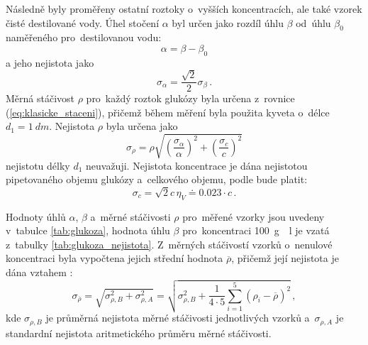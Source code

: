 \documentclass{../concepts/titul_protokol_p/prepareprotokol} %
\newcommand{\relative}[1]{
\frac{\sigma_{#1}}{#1}
}
\newcommand{\squared}[1]{
\left( #1 \right)^2
}
\newcommand{\relsqr}[1]{
\squared{\relative{#1}}
}
\begin{document}
Následně byly proměřeny ostatní roztoky o~vyšších koncentracích, ale také vzorek čisté destilované vody. 
Úhel stočení $\alpha$ byl určen jako rozdíl úhlu $\beta$ od~úhlu $\beta_0$ naměřeného pro~destilovanou vodu:
\begin{equation}
    \label{eq:alfa_glukoza}
    \alpha = \beta - \beta_0
\end{equation}
a jeho nejistota jako \cite{englich}
\begin{equation}
    \label{eq:sigma_alfa_glukoza}
    \sigma_{\alpha} = \frac{\sqrt{2}}{2} \sigma_{\beta} \,.
\end{equation}
Měrná stáčivost $\rho$ pro~každý roztok glukózy byla určena z~rovnice (\ref{eq:klasicke_staceni}), přičemž během 
měření byla použita kyveta 
o~délce $d_1 = \qty{1}{dm}$. Nejistota $\rho$ byla určena jako \cite{englich}
\begin{equation}
    \label{eq:sigma_rho}
    \sigma_{\rho} = \rho \sqrt{ \relsqr{\alpha} + \relsqr{c}}
\end{equation}
nejistotu délky $d_1$ neuvažuji. Nejistota koncentrace je dána nejistotou pipetovaného objemu glukózy a~celkového
objemu, podle \cite{englich} bude platit:
\begin{equation}
    \label{eq:sigma_c}
    \sigma_c = \sqrt{2} c \,\eta_V \doteq 0.023 \cdot c \,.
\end{equation}

Hodnoty úhlů $\alpha$, $\beta$ a~měrné stáčivosti $\rho$ pro~měřené vzorky
jsou uvedeny v~tabulce \ref{tab:glukoza}, hodnota úhlu $\beta$ pro~koncentraci \qty{100}{g \per l} je vzatá
z~tabulky \ref{tab:glukoza_nejistota}. Z~měrných stáčivostí vzorků o~nenulové koncentraci byla vypočtena
jejich střední hodnota $\overline{\rho}$, přičemž její nejistota je dána vztahem \cite{englich}:
\begin{equation}
    \label{eq:sigma_mean_rho}
    \sigma_{\overline{\rho}} = \sqrt{ \sigma_{\rho, B}^2 + \sigma_{\rho,A}^2 } = \sqrt{ \sigma_{\rho, B}^2 + 
        \frac{1}{4\cdot 5} \sum_{i=1}^{5} \left( \rho_i - \overline{\rho} \right)^2 } \,,
\end{equation}
kde $\sigma_{\rho, B}$ je průměrná nejistota měrné stáčivosti jednotlivých vzorků a~$\sigma_{\rho, A}$ je standardní
nejistota aritmetického průměru měrné stáčivosti.
\end{document}
